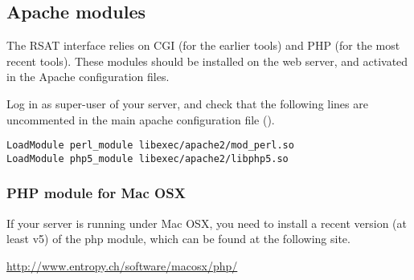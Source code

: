 \documentclass[12pt,a4paper, twoside]{scrreprt} %
\begin{document}
\subsection{Apache modules}

The RSAT interface relies on CGI (for the earlier tools) and PHP (for
the most recent tools). These modules should be installed on the web
server, and activated in the Apache configuration files. 

Log in as super-user of your server, and check that the following
lines are uncommented in the main apache configuration file
().

\begin{lstlisting}
LoadModule perl_module libexec/apache2/mod_perl.so
LoadModule php5_module libexec/apache2/libphp5.so
\end{lstlisting}
                                                        

\subsubsection{PHP module for Mac OSX}

If your server is running under Mac OSX, you need to install a recent
version (at least v5) of the php module, which can be found at the following site. 

\url{http://www.entropy.ch/software/macosx/php/}







\end{document}
